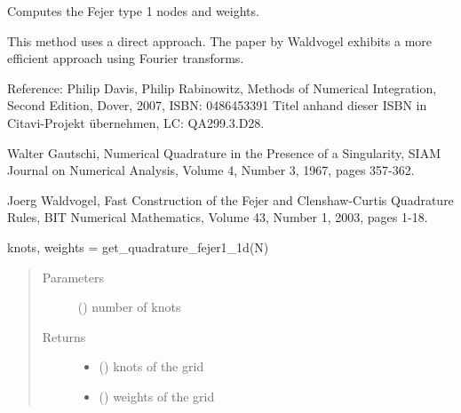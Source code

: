 \documentclass[letterpaper,10pt,english,openany,oneside]{sphinxmanual}
\begin{document}
\begin{fulllineitems}
\label{\detokenize{pygpc:pygpc.grid.get_quadrature_fejer1_1d}}
Computes the Fejer type 1 nodes and weights.

This method uses a direct approach. The paper by Waldvogel
exhibits a more efficient approach using Fourier transforms.

Reference:
Philip Davis, Philip Rabinowitz,
Methods of Numerical Integration,
Second Edition,
Dover, 2007,
ISBN: 0486453391 Titel anhand dieser ISBN in Citavi-Projekt übernehmen,
LC: QA299.3.D28.

Walter Gautschi,
Numerical Quadrature in the Presence of a Singularity,
SIAM Journal on Numerical Analysis,
Volume 4, Number 3, 1967, pages 357-362.

Joerg Waldvogel,
Fast Construction of the Fejer and Clenshaw-Curtis Quadrature Rules,
BIT Numerical Mathematics,
Volume 43, Number 1, 2003, pages 1-18.

knots, weights = get\_quadrature\_fejer1\_1d(N)
\begin{quote}\begin{description}
\item[{Parameters}] \leavevmode
{} () \textendash{} number of knots

\item[{Returns}] \leavevmode
\begin{itemize}
\item {} 
 () \textendash{} knots of the grid

\item {} 
 () \textendash{} weights of the grid

\end{itemize}


\end{description}\end{quote}

\end{fulllineitems}

\end{document}
